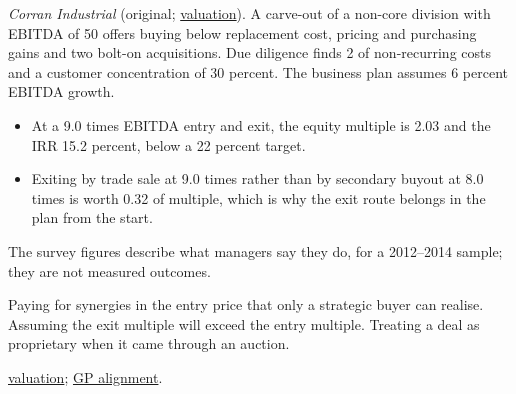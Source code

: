 \begin{qfmethod}
 \emph{Corran Industrial} (original; \hyperref[meth:private-equity-valuation]{valuation}). A carve-out of a non-core division with EBITDA of 50 offers buying below replacement cost, pricing and purchasing gains and two bolt-on acquisitions. Due diligence finds 2 of non-recurring costs and a customer concentration of 30 percent. The business plan assumes 6 percent EBITDA growth.
\begin{itemize}
\item At a 9.0 times EBITDA entry and exit, the equity multiple is 2.03 and the IRR 15.2 percent, below a 22 percent target.
\item Exiting by trade sale at 9.0 times rather than by secondary buyout at 8.0 times is worth 0.32 of multiple, which is why the exit route belongs in the plan from the start.
\end{itemize}

 The survey figures describe what managers say they do, for a 2012--2014 sample; they are not measured outcomes.

 Paying for synergies in the entry price that only a strategic buyer can realise. Assuming the exit multiple will exceed the entry multiple. Treating a deal as proprietary when it came through an auction.

 \hyperref[meth:private-equity-valuation]{valuation}; \hyperref[meth:gp-alignment-net-returns]{GP alignment}.

\end{qfmethod}


